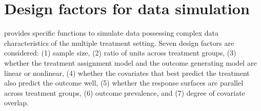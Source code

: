 
\section{Design factors for data simulation}\label{sec:simulation}
 provides specific functions to simulate data possessing complex data characteristics of the multiple treatment setting. Seven design factors are considered: (1) sample size, (2) ratio of units across treatment groups,  (3) whether the treatment assignment model and the outcome generating model are linear or nonlinear,  (4) whether the covariates that best predict the treatment also predict the outcome well, (5) whether the response surfaces are parallel across treatment groups, (6) outcome prevalence, and (7) degree of covariate overlap. 

